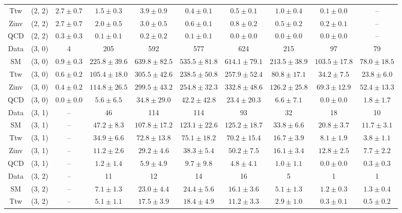 \begin{table}[h!]
{\begin{tabular}{cccccccccc}
	Ttw & (2, 2) & $2.7\pm 0.7$ & $1.5\pm 0.3$ & $3.9\pm 0.9$ & $0.4\pm 0.1$ & $0.5\pm 0.1$ & $1.0\pm 0.4$ & $0.1\pm 0.0$ & -- \\[0.5ex] 
	Zinv & (2, 2) & $2.7\pm 0.7$ & $2.0\pm 0.5$ & $3.0\pm 0.5$ & $0.6\pm 0.1$ & $0.8\pm 0.2$ & $0.5\pm 0.2$ & $0.2\pm 0.1$ & -- \\[0.5ex] 
	QCD & (2, 2) & $0.3\pm 0.3$ & $0.1\pm 0.1$ & $0.2\pm 0.2$ & $0.1\pm 0.1$ & $0.0\pm 0.0$ & $0.0\pm 0.0$ & $0.0\pm 0.0$ & -- \\[0.5ex] 
	Data & (3, 0) & 4 & 205 & 592 & 577 & 624 & 215 & 97 & 79 \\[0.5ex] 
	SM & (3, 0) & $0.9\pm 0.3$ & $225.8\pm 39.6$ & $639.8\pm 82.5$ & $535.5\pm 81.8$ & $614.1\pm 79.1$ & $213.5\pm 38.9$ & $103.5\pm 17.8$ & $78.0\pm 18.5$ \\[0.5ex] 
	Ttw & (3, 0) & $0.6\pm 0.2$ & $105.4\pm 18.0$ & $305.5\pm 42.6$ & $238.5\pm 50.8$ & $257.9\pm 52.4$ & $80.8\pm 17.1$ & $34.2\pm 7.5$ & $23.8\pm 6.0$ \\[0.5ex] 
	Zinv & (3, 0) & $0.4\pm 0.2$ & $114.8\pm 26.5$ & $299.5\pm 43.2$ & $254.8\pm 32.3$ & $332.8\pm 48.6$ & $126.2\pm 25.8$ & $69.3\pm 12.9$ & $52.4\pm 13.3$ \\[0.5ex] 
	QCD & (3, 0) & $0.0\pm 0.0$ & $5.6\pm 6.5$ & $34.8\pm 29.0$ & $42.2\pm 42.8$ & $23.4\pm 20.3$ & $6.6\pm 7.1$ & $0.0\pm 0.0$ & $1.8\pm 1.7$ \\[0.5ex] 
	Data & (3, 1) & -- & 46 & 114 & 114 & 93 & 32 & 18 & 10 \\[0.5ex] 
	SM & (3, 1) & -- & $47.2\pm 8.3$ & $107.8\pm 17.2$ & $123.1\pm 22.6$ & $125.2\pm 18.7$ & $33.8\pm 6.6$ & $20.8\pm 3.7$ & $11.7\pm 3.1$ \\[0.5ex] 
	Ttw & (3, 1) & -- & $34.9\pm 6.6$ & $72.8\pm 13.8$ & $75.1\pm 18.2$ & $70.2\pm 15.4$ & $16.7\pm 3.9$ & $8.1\pm 1.9$ & $3.8\pm 1.1$ \\[0.5ex] 
	Zinv & (3, 1) & -- & $11.2\pm 2.6$ & $29.2\pm 4.6$ & $38.3\pm 5.4$ & $50.2\pm 7.5$ & $16.1\pm 3.4$ & $12.8\pm 2.5$ & $7.7\pm 2.2$ \\[0.5ex] 
	QCD & (3, 1) & -- & $1.2\pm 1.4$ & $5.9\pm 4.9$ & $9.7\pm 9.8$ & $4.8\pm 4.1$ & $1.0\pm 1.1$ & $0.0\pm 0.0$ & $0.3\pm 0.3$ \\[0.5ex] 
	Data & (3, 2) & -- & 11 & 12 & 14 & 16 & 5 & 1 & 1 \\[0.5ex] 
	SM & (3, 2) & -- & $7.1\pm 1.3$ & $23.0\pm 4.4$ & $24.4\pm 5.6$ & $16.1\pm 3.6$ & $5.1\pm 1.3$ & $1.2\pm 0.3$ & $1.3\pm 0.4$ \\[0.5ex] 
	Ttw & (3, 2) & -- & $5.1\pm 1.1$ & $17.5\pm 3.9$ & $18.4\pm 4.9$ & $11.2\pm 3.3$ & $2.9\pm 1.0$ & $0.3\pm 0.1$ & $0.5\pm 0.2$ \\[0.5ex] 

\end{tabular}}
\end{table}
